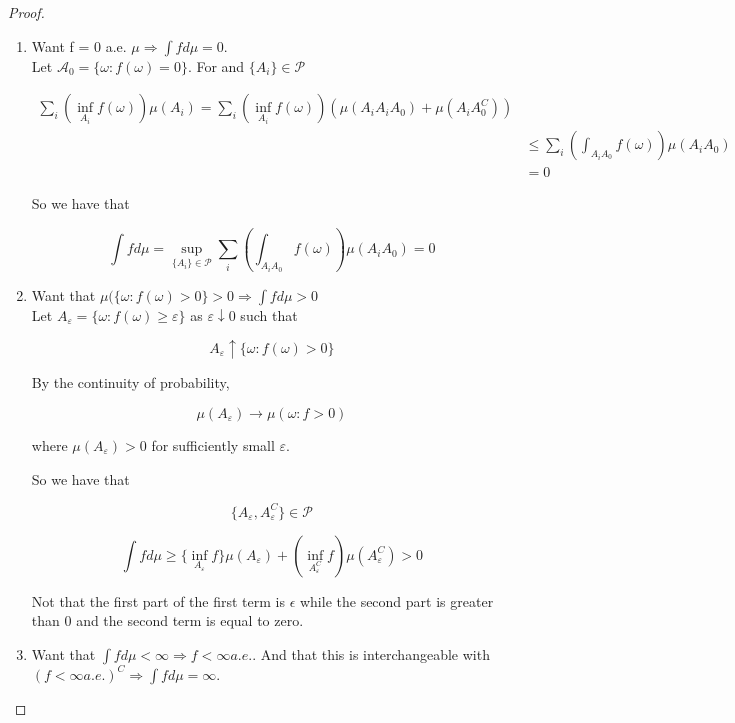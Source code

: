 \documentclass[11pt,fleqn]{book} %
\begin{document}
\begin{proof}
	\begin{enumerate}
		\item Want f = 0 a.e. $\mu \Rightarrow \int f d\mu = 0$.\\

		Let $\mathcal{A}_0 = \{\omega: f(\omega) = 0 \}$. For and $\{A_i\} \in \mathcal{P}$

				\begin{align*}
					\sum_i (\inf_{A_i} f(\omega)) \mu(A_i) = \sum_i (\inf_{A_i} f(\omega)) (\mu(A_i A_i A_0) + \mu(A_i A_0^C))\\
							&\leq \sum_i (\int_{A_i A_0} f(\omega))\mu(A_i A_0)\\
							&= 0
				\end{align*} 

		So we have that 

				$$\int f d\mu = \sup_{\{A_i\} \in \mathcal{P}} \sum_i (\int_{A_i A_0} f(\omega))\mu(A_i A_0) = 0 $$

		
		\item Want that $\mu(\{\omega: f(\omega) > 0 \} > 0 \Rightarrow \int f d\mu > 0$\\

		Let $A_\varepsilon = \{\omega: f(\omega) \geq \varepsilon\}$ as $\varepsilon \downarrow 0$ such that

				$$A_\varepsilon \uparrow \{\omega: f(\omega) > 0\} $$

		By the continuity of probability, 

				$$\mu(A_\varepsilon) \rightarrow \mu(\omega: f> 0) $$

		where $\mu (A_\varepsilon) > 0$ for sufficiently small $\varepsilon$.

		So we have that 

				$$\{A_\varepsilon, A_\varepsilon^C \} \in \mathcal{P} $$

				$$\int f d\mu \geq \{\inf_{A_\varepsilon} f\} \mu(A_\varepsilon) + (\inf_{A_\varepsilon^C} f) \mu(A_\varepsilon^C) > 0 $$

	Not that the first part of the first term is $\epsilon$ while the  second part is greater than 0 and the second term is equal to zero. \\

		\item Want that $\int f d\mu < \infty \Rightarrow f < \infty a. e.$. And that this is interchangeable with $(f < \infty a.e.)^C \Rightarrow \int f d\mu = \infty$.\\


\end{enumerate}
\end{proof}
\end{document}
